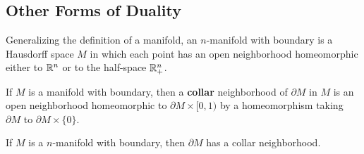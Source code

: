 \subsection{Other Forms of Duality}
Generalizing the definition of a manifold, an $n$-manifold with boundary is a
Hausdorff space $M$ in which each point has an open neighborhood homeomorphic
either to $\mathbb{R}^n$ or to the half-space $\mathbb{R}^n_+$.\par
If $M$ is a manifold with boundary, then a \textbf{collar} neighborhood of $\partial M$ in $M$ is an open neighborhood homeomorphic to $\partial M\times[0,1)$ by a homeomorphism taking $\partial M$ to $\partial M\times\{0\}$.
\begin{proposition}
If $M$ is a $n$-manifold with boundary, then $\partial M$ has a collar neighborhood.
\end{proposition}
